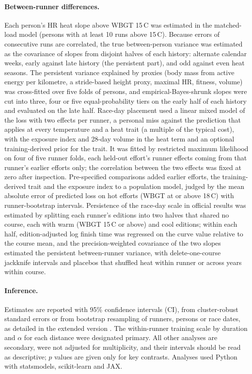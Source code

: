 \documentclass[12pt]{article}
\newcommand{\degC}{\,\textdegree C}
\begin{document}
\paragraph{Between-runner differences.} Each person's HR heat slope above WBGT 15\degC{} was estimated in the matched-load model (persons with at least 10 runs above 15\degC). Because errors of consecutive runs are correlated, the true between-person variance was estimated as the covariance of slopes from disjoint halves of each history: alternate calendar weeks, early against late history (the persistent part), and odd against even heat seasons. The persistent variance explained by proxies (body mass from active energy per kilometre, a stride-based height proxy, maximal HR, fitness, volume) was cross-fitted over five folds of persons, and empirical-Bayes-shrunk slopes were cut into three, four or five equal-probability tiers on the early half of each history and evaluated on the late half. Race-day placement used a linear mixed model of the loss with two effects per runner, a personal miss against the prediction that applies at every temperature and a heat trait (a multiple of the typical cost), with the exposure index and 28-day volume in the heat term and an optional training-derived prior for the trait. It was fitted by restricted maximum likelihood on four of five runner folds, each held-out effort's runner effects coming from that runner's earlier efforts only; the correlation between the two effects was fixed at zero after inspection. Pre-specified comparisons added earlier efforts, the training-derived trait and the exposure index to a population model, judged by the mean absolute error of predicted loss on hot efforts (WBGT at or above 18\degC) with runner-bootstrap intervals. Persistence of the race-day scale in official results was estimated by splitting each runner's editions into two halves that shared no course, each with warm (WBGT 15\degC{} or above) and cool editions; within each half, edition-adjusted log finish time was regressed on the curve value relative to the course mean, and the precision-weighted covariance of the two slopes estimated the persistent between-runner variance, with delete-one-course jackknife intervals and placebos that shuffled heat within runner or across years within course.

\paragraph{Inference.} Estimates are reported with 95\% confidence intervals (CI), from cluster-robust standard errors or from bootstrap resampling of runners, persons or race dates, as detailed in the extended version \cite{dunphy2026extended}. The within-runner training scale by duration and $\alpha$ for each distance were designated primary. All other analyses are secondary, were not adjusted for multiplicity, and their intervals should be read as descriptive; $p$ values are given only for key contrasts. Analyses used Python with statsmodels, scikit-learn and JAX.
\end{document}
